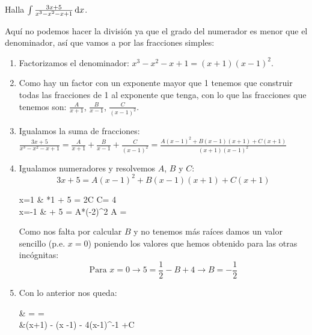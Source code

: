 \documentclass[a4paper,11pt,answers]{exam}
\begin{document}
\begin{questions}
\question Halla $\int \frac{3x + 5}{x^3 - x^2 - x + 1}\,\mathrm{d}x$.
\begin{solution}
Aquí no podemos hacer la división ya que el grado del numerador es menor que el denominador, así que vamos a por las fracciones simples:\\
\begin{enumerate}
	\item Factorizamos el denominador: $x^3 - x^2 - x + 1 = (x+1) (x-1)^2$.
	\item Como hay un factor con un exponente mayor que 1 tenemos que construir todas las fracciones de 1 al exponente que tenga, con lo que las fracciones que tenemos son: $\frac{A}{x+1}$, $\frac{B}{x-1}$, $\frac{C}{(x-1)^2}$.
	\item Igualamos la suma de fracciones: $\frac{3x + 5}{x^3 - x^2 - x + 1} = \frac{A}{x+1} + \frac{B}{x-1} + \frac{C}{(x-1)^2} =
	\frac{A(x-1)^2 + B(x-1)(x+1) + C(x+1)}{(x+1)(x-1)^2}$
	\item Igualamos numeradores y resolvemos $A$, $B$ y $C$:
	\[3x + 5 = A(x-1)^2 + B(x-1)(x+1) + C(x+1)\]
	\begin{flalign*}
	 x=1 &  *1 + 5 = 2C \to C= 4\\
	 x=-1 &  + 5 = A*(-2)^2 \to A = \\
	\end{flalign*}
	Como nos falta por calcular $B$ y no tenemos más raíces damos un valor sencillo (p.e. $x= 0$) poniendo los valores que hemos obtenido para las otras incógnitas:
	\[\text{Para }x= 0 \to 5 = \frac{1}{2} - B + 4 \to B= -\frac{1}{2}\]
	\item Con lo anterior nos queda: 
	\begin{flalign*}
	& =
	 =\\
	&\ln(x+1) - \ln(x -1) - 4(x-1)^{-1} +C
	\end{flalign*}
\end{enumerate}

\end{solution}


\end{questions}
\end{document}
